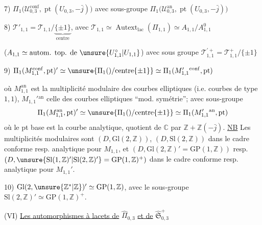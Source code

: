 7) $\Pi_1\bigl(\mathcal U_{0,3}^{\mathrm{conf}},\operatorname{pt}(U_{0,3},-\bar j)\bigr)$
avec sous-groupe $\Pi_1\bigl(\mathcal U_{0,3}^{\mathrm{an}},\operatorname{pt}(U_{0,3},-\bar j)\bigr)$


8) $\mathcal T'_{1,1}=\mathcal T_{1,1}/\underbrace{\{\pm1\}}_{\text{centre}}$,
avec $\mathcal T_{1,1}\simeq\operatorname{Autext}_{\mathrm{lac}}(\Pi_{1,1})
\simeq A_{1,1}/A_{1,1}^{0}$

($A_{1,1}\simeq\text{autom. top. de }\unsure{U_{1,1}^{\circ}|U_{1,1}}$)
avec sous groupe $\mathcal T_{1,1}^{\prime+}=\mathcal T_{1,1}^{+}/\{\pm1\}$


9) $\Pi_1(M_{1,1}^{\mathrm{conf}},\mathrm{pt})' \simeq \unsure{\Pi_1()/\mathrm{centre}\{\pm1\}} \simeq \Pi_1(M_{1,1}'{}^{\mathrm{conf}},\mathrm{pt})$

où $M_{1,1}^{\mathrm{an}}$ est la multiplicité modulaire  des courbes elliptiques  (i.e. courbes  de type $1,1$), $M_{1,1}'{}^{\mathrm{an}}$ celle des courbes elliptiques  ``mod. symétrie''; avec sous-groupe
\[
\Pi_1(M_{1,1}^{\mathrm{an}},\mathrm{pt})' \simeq \unsure{\Pi_1()/\mathrm{centre}\{\pm1\}} \simeq \Pi_1(M_{1,1}'{}^{\mathrm{an}},\mathrm{pt})
\]
où le pt base est la courbe  analytique, quotient de $\mathbb C$ par $\mathbb Z+\mathbb Z(-\bar j)$. \uline{NB} Les multiplicités modulaires sont $(D,\mathrm{Gl}(2,\mathbb Z))$, $(D,\mathrm{Sl}(2,\mathbb Z))$ dans le cadre  conforme resp. analytique pour $M_{1,1}$, et $(D,\mathrm{Gl}(2,\mathbb Z)'=\mathrm{GP}(1,\mathbb Z))$ resp. $(D,\unsure{\mathrm{Sl}(1,\mathbb Z)'|\mathrm{Sl}(2,\mathbb Z)'}=\mathrm{GP}(1,\mathbb Z)^+)$ dans le cadre conforme resp. analytique pour $M_{1,1}'$.

10) $\mathrm{Gl}(2,\unsure{\mathbb Z^{\ast}|\mathbb Z})' \simeq \mathrm{GP}(1,\mathbb Z)$, avec le sous-groupe $\mathrm{Sl}(2,\mathbb Z)'\simeq\mathrm{GP}(1,\mathbb Z)^+$.


(VI) \uline{Les automorphismes à lacets de} $\widehat{\Pi}_{0,3}$ \uline{et de} $\widehat{\mathfrak S}_{0,3}^{+}$

